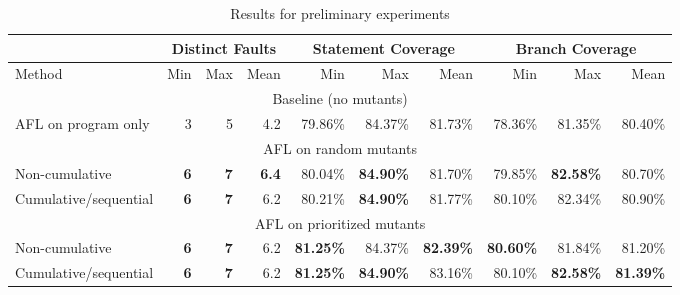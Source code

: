 \begin{table*}
  \renewcommand{\arraystretch}{1.3}
\caption{Results for preliminary experiments}
  
  \centering
  \begin{tabular}{l||r|r|r||r|r|r||r|r|r}
    & \multicolumn{3}{|c||}{Distinct Faults} & \multicolumn{3}{|c||}{Statement Coverage} &
                                                                    \multicolumn{3}{|c}{Branch Coverage} \\
    \hline
  Method & Min & Max  & Mean & Min & Max & Mean
                                                                  
  & Min & Max & Mean \\
    \hline
    \hline
   \multicolumn{10}{c}{Baseline (no mutants)} \\    
    \hline
  AFL on program only & 3 & 5 & 4.2 & 79.86\% & 84.37\% & 81.73\% &
                                                                    78.36\%
                                  & 81.35\% & 80.40\%\\
    \hline
    \hline
    \multicolumn{10}{c}{AFL on random mutants} \\
    \hline
 Non-cumulative  & {\bf 6} & {\bf 7} & {\bf 6.4} & 80.04\% &
                                                                   {\bf
                                                                                     84.90\%}
                      & 81.70\% & 79.85\% & {\bf 82.58\%} & 80.70\%\\
  \hline
 Cumulative/sequential & {\bf 6} & {\bf 7} & 6.2 & 80.21\%
                                                               &
                                                                 {\bf 84.90\%}
                      & 81.77\%
                            & 80.10\% & 82.34\% & 80.90\%\\
    \hline
    \hline
    \multicolumn{10}{c}{AFL on prioritized mutants} \\
    \hline
    Non-cumulative  & {\bf 6} & {\bf 7} & 6.2 &
                                                                {\bf 81.25\%}
               & 84.37\% & {\bf 82.39\%} & {\bf 80.60\%} & 81.84\% & 81.20\% \\
    \hline
   Cumulative/sequential  & {\bf 6} &
                                                                   {\bf 7} & 6.2 &
    {\bf 81.25\%} & {\bf 84.90\%} & 83.16\% & 80.10\% & {\bf 82.58\%} & {\bf 81.39\%}\\    
  \hline
  \end{tabular}
  \label{tab:prelim}

\end{table*}

